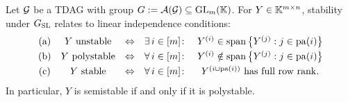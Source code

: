 \begin{theorem} \label{thm:StabilityLinearIndepTDAG}
	Let $\mathcal{G}$ be a TDAG with group $G := \mathcal{A}(\mathcal{G}) \subseteq \operatorname{GL}_m(\mathbb K)$. For $Y \in \mathbb K^{m \times n}$, stability under $G_{\operatorname{SL}}$ relates to linear independence conditions:
	\[ \begin{matrix} \text{(a)} & Y \text{ unstable}  & \Leftrightarrow & \exists \, i \in [m] \colon &  Y^{(i)} \in \operatorname{span} \big\lbrace Y^{(j)} : j \in \operatorname{pa}(i)  \big\rbrace \\[3pt]
		\text{(b)} & Y \text{ polystable}  & \Leftrightarrow & \forall \, i \in [m] \colon &  Y^{(i)} \notin \operatorname{span} \big\lbrace Y^{(j)} : j \in \operatorname{pa}(i)  \big\rbrace \\[3pt]
		\text{(c)} & Y \text{ stable} & \Leftrightarrow & \forall \, i \in [m] \colon & Y^{(i \cup \operatorname{pa}(i))} \text{ has full row rank} . \\ \end{matrix} \] 
	In particular, $Y$ is semistable if and only if it is polystable.
\end{theorem}

